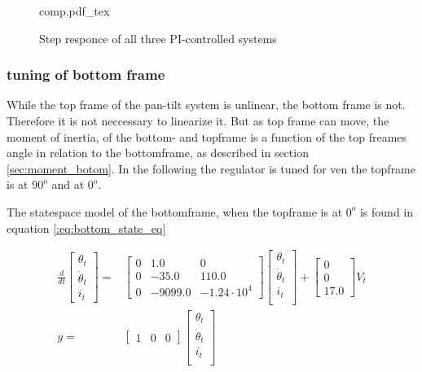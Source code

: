 \documentclass[../../../Main]{subfiles}
\begin{document}
\begin{figure}[H]
\centering
\def\svgwidth{\textwidth}
{comp.pdf_tex}
\caption{Step responce of all three PI-controlled systems}
\label{fig:comp}
\end{figure}

\subsubsection{tuning of bottom frame}

While the top frame of the pan-tilt system is unlinear, the bottom frame is not. Therefore it is not neccessary to linearize it. But as top frame can move, the moment of inertia, of the bottom- and topframe is a function of the top freames angle in relation to the bottomframe, as described in section \ref{sec:moment_botom}.
In the following the regulator is tuned for ven the topframe is at $90^o$ and at $0^o$.

The statespace model of the bottomframe, when the topframe is at $0^o$  is found in equation \ref{:eq:bottom_state_eq}

\begin{equation}
      \label{eq:bottom_state_eq}
      \begin{split}
      \frac{d}{dt}
    \begin{bmatrix}
        \theta_t \\
        \dot \theta_t \\
        i_t
    \end{bmatrix}
    =&
    \begin{bmatrix}0 & 1.0 & 0\\ 0 & -35.0 & 110.0\\ 0 & -9099.0 & -1.24\cdot10^4\end{bmatrix}
    \begin{bmatrix}
        \theta_t \\
        \dot \theta_t \\
        i_t \\
    \end{bmatrix}
    +
    \begin{bmatrix}
      0\\ 0\\ 17.0
    \end{bmatrix}
    V_t
\\
      y =&
    \begin{bmatrix}
        1 & 0 & 0
    \end{bmatrix}
    \begin{bmatrix}
        \theta_t \\
        \dot \theta_t\\
        i_t\\
    \end{bmatrix}
    \end{split}
\end{equation}
\end{document}
